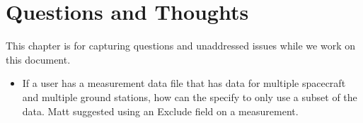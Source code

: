 \chapter{Questions and Thoughts}

This chapter is for capturing questions and unaddressed issues while
we work on this document.

\begin{itemize}
     \item If a user has a measurement data file that has data for
     multiple spacecraft and multiple ground stations, how can the
     specify to only use a subset of the data.  Matt suggested using
     an Exclude field on a measurement.
\end{itemize}
